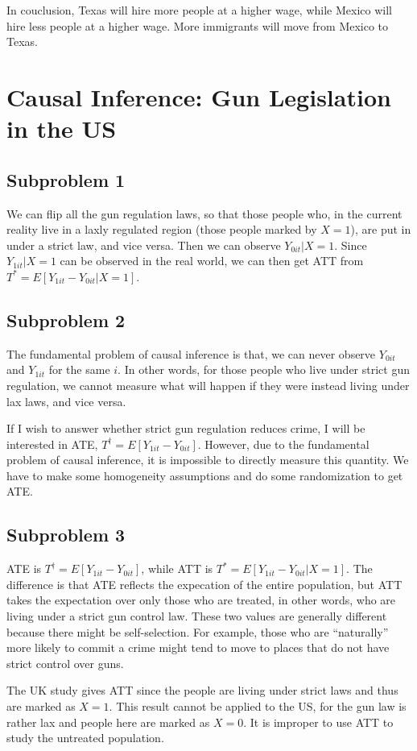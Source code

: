 \documentclass{article}
\begin{document}
In couclusion, Texas will hire more people at a higher wage, while Mexico will hire less people at a higher wage. More immigrants will move from Mexico to Texas.

\section{Causal Inference: Gun Legislation in the US}
\subsection{Subproblem 1}
We can flip all the gun regulation laws, so that those people who, in the current reality live in a laxly regulated region (those people marked by $X=1$), are put in under a strict law, and vice versa. Then we can observe $Y_{0it}|X=1$. Since $Y_{1it}|X=1$ can be observed in the real world, we can then get ATT from $T^*=E[Y_{1it}-Y_{0it}|X=1]$.

\subsection{Subproblem 2}
The fundamental problem of causal inference is that, we can never observe $Y_{0it}$ and $Y_{1it}$ for the same $i$. In other words, for those people who live under strict gun regulation, we cannot measure what will happen if they were instead living under lax laws, and vice versa.

If I wish to answer whether strict gun regulation reduces crime, I will be interested in ATE, $T^\dag=E[Y_{1it}-Y_{0it}]$. However, due to the fundamental problem of causal inference, it is impossible to directly measure this quantity. We have to make some homogeneity assumptions and do some randomization to get ATE.

\subsection{Subproblem 3}
ATE is $T^\dag=E[Y_{1it}-Y_{0it}]$, while ATT is $T^*=E[Y_{1it}-Y_{0it}|X=1]$. The difference is that ATE reflects the expecation of the entire population, but ATT takes the expectation over only those who are treated, in other words, who are living under a strict gun control law. These two values are generally different because there might be self-selection. For example, those who are ``naturally'' more likely to commit a crime might tend to move to places that do not have strict control over guns.

The UK study gives ATT since the people are living under strict laws and thus are marked as $X=1$. This result cannot be applied to the US, for the gun law is rather lax and people here are marked as $X=0$. It is improper to use ATT to study the untreated population.
\end{document}
